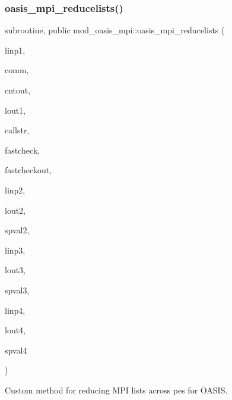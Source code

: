\subsubsection{\texorpdfstring{oasis\+\_\+mpi\+\_\+reducelists()}{oasis\_mpi\_reducelists()}}
{\footnotesize\ttfamily subroutine, public mod\+\_\+oasis\+\_\+mpi\+::oasis\+\_\+mpi\+\_\+reducelists (\begin{DoxyParamCaption}\item[{character($\ast$), dimension(\+:), intent(inout), allocatable}]{linp1,  }\item[{integer, intent(in)}]{comm,  }\item[{integer, intent(out)}]{cntout,  }\item[{character($\ast$), dimension(\+:), intent(inout), allocatable}]{lout1,  }\item[{character($\ast$), intent(in)}]{callstr,  }\item[{logical, intent(in), optional}]{fastcheck,  }\item[{logical, intent(out), optional}]{fastcheckout,  }\item[{character($\ast$), dimension(\+:), intent(inout), optional, allocatable}]{linp2,  }\item[{character($\ast$), dimension(\+:), intent(inout), optional, allocatable}]{lout2,  }\item[{character($\ast$), intent(in), optional}]{spval2,  }\item[{integer, dimension(\+:), intent(in), optional, allocatable}]{linp3,  }\item[{integer, dimension(\+:), intent(inout), optional, allocatable}]{lout3,  }\item[{integer, intent(in), optional}]{spval3,  }\item[{integer, dimension(\+:), intent(in), optional, allocatable}]{linp4,  }\item[{integer, dimension(\+:), intent(inout), optional, allocatable}]{lout4,  }\item[{integer, intent(in), optional}]{spval4 }\end{DoxyParamCaption})}



Custom method for reducing M\+PI lists across pes for O\+A\+S\+IS. 


